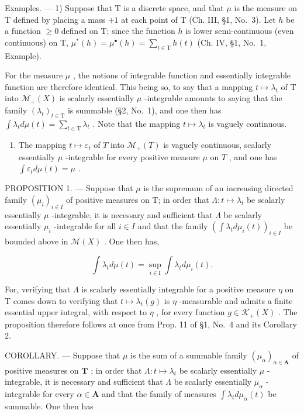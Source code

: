Examples. --- 1) Suppose that T is a discrete space, and that \(\mu\) is the measure on T defined by placing a mass \(+1\) at each point of T (Ch. III, §1, No.~3). Let \(h\) be a function \(\geqslant 0\) defined on T; since the function \(h\) is lower semi-continuous (even continuous) on T, \(\mu^{*}(h) = \mu^{\bullet}(h) = \sum_{t\in \mathrm{T}}h(t)\) (Ch. IV, §1, No.~1, Example).

For the measure \(\mu\) , the notions of integrable function and essentially integrable function are therefore identical. This being so, to say that a mapping \(t \mapsto \lambda_t\) of T into \(\mathcal{M}_+(X)\) is scalarly essentially \(\mu\) -integrable amounts to saying that the family \((\lambda_t)_{t \in \mathrm{T}}\) is summable (§2, No.~1), and one then has \(\int \lambda_t d\mu(t) = \sum_{t \in \mathrm{T}} \lambda_t\) . Note that the mapping \(t \mapsto \lambda_t\) is vaguely continuous.

\begin{enumerate}
\def\labelenumi{\arabic{enumi})}
\setcounter{enumi}{1}
\tightlist
\item
  The mapping \(t \mapsto \varepsilon_t\) of \(T\) into \(\mathcal{M}_+(T)\) is vaguely continuous, scalarly essentially \(\mu\) -integrable for every positive measure \(\mu\) on \(T\) , and one has \(\int \varepsilon_t d\mu(t) = \mu\) .
\end{enumerate}

PROPOSITION 1. --- Suppose that \(\mu\) is the supremum of an increasing directed family \((\mu_i)_{i \in I}\) of positive measures on T; in order that \(\Lambda : t \mapsto \lambda_t\) be scalarly essentially \(\mu\) -integrable, it is necessary and sufficient that \(\Lambda\) be scalarly essentially \(\mu_i\) -integrable for all \(i \in I\) and that the family \(\left( \int \lambda_t d\mu_i(t) \right)_{i \in I}\) be bounded above in \(\mathcal{M}(X)\) . One then has,

\[
\int \lambda_ {t} d \mu (t) = \sup _ {i \in \mathrm{I}} \int \lambda_ {t} d \mu_ {i} (t).\tag{2}
\]

For, verifying that \(\Lambda\) is scalarly essentially integrable for a positive measure \(\eta\) on T comes down to verifying that \(t \mapsto \lambda_{t}(g)\) is \(\eta\) -measurable and admits a finite essential upper integral, with respect to \(\eta\) , for every function \(g \in \mathcal{K}_{+}(X)\) . The proposition therefore follows at once from Prop. 11 of §1, No.~4 and its Corollary 2.

COROLLARY. --- Suppose that \(\mu\) is the sum of a summable family \((\mu_{\alpha})_{\alpha \in \mathbf{A}}\) of positive measures on \(\mathbf{T}\) ; in order that \(\Lambda : t \mapsto \lambda_t\) be scalarly essentially \(\mu\) -integrable, it is necessary and sufficient that \(\Lambda\) be scalarly essentially \(\mu_{\alpha}\) -integrable for every \(\alpha \in \mathbf{A}\) and that the family of measures \(\int \lambda_t d\mu_{\alpha}(t)\) be summable. One then has

